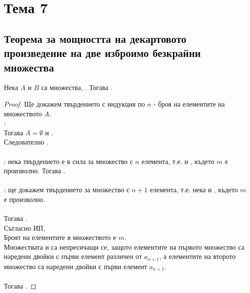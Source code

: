 \section{Тема 7}

\subsection*{Теорема за мощността на декартовото произведение на две изброимо безкрайни множества}
\begin{theorem}
    Нека \(A\) и \(B\) са множества, . Тогава .    
\end{theorem}
\begin{proof}
    Ще докажем твърдението с индукция по \(n\) - броя на елементите на множеството \(A\). \\
    :  \\
    Тогава \(A = \emptyset\) и . \\
    Следователно . \\ \\
    : нека твърдението е в сила за множество с \(n\) елемента, т.е.
     и , където \(m\) е произволно. Тогава
    . \\ \\
    : ще докажем твърдението за множество с \(n + 1\) елемента, т.е. нека 
     и , където \(m\) е произволно. \\ \\
    Тогава . \\
    Съгласно ИП,  \\
    Броят на елементите в множеството  е \(m\). \\
    Множествата  и  са непресичащи се, защото елементите на първото множество са наредени 
    двойки с първи елемент различен от \(a_{n + 1}\), а елементите на второто множество са наредени 
    двойки с първи елемент \(a_{n + 1}\). \\ \\
    Тогава .
\end{proof}

